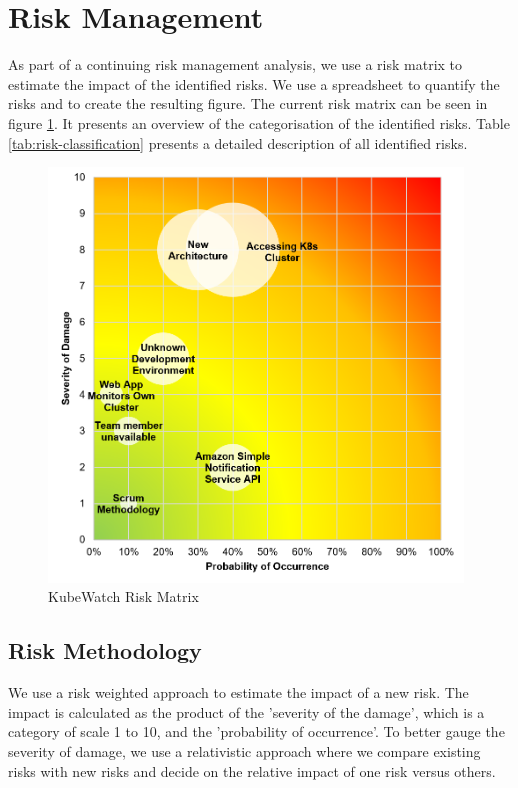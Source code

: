 \section{Risk Management}

As part of a continuing risk management analysis, we use a risk matrix to estimate the impact of the identified risks.\newline
We use a spreadsheet to quantify the risks and to create the resulting figure. The current risk matrix can be seen in figure \ref{fig:risk-matrix}. It presents an overview of the categorisation of the identified risks. Table \ref{tab:risk-classification} presents a detailed description of all identified risks.

\begin{figure}[h!]
    \centering
    \caption{KubeWatch Risk Matrix}
    \label{fig:risk-matrix}
    \includegraphics[width=11cm]{resources/risk_matrix.png}
\end{figure}

\subsection{Risk Methodology}
We use a risk weighted approach to estimate the impact of a new risk. The impact is calculated as the product of the 'severity of the damage', which is a category of scale 1 to 10, and the 'probability of occurrence'. To better gauge the severity of damage, we use a relativistic approach where we compare existing risks with new risks and decide on the relative impact of one risk versus others.

